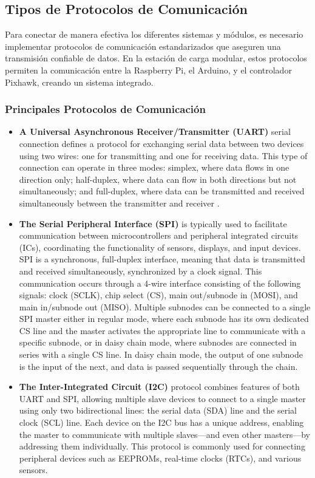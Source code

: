 \documentclass{article}
\begin{document}
\subsection{Tipos de Protocolos de Comunicación}

Para conectar de manera efectiva los diferentes sistemas y módulos, es necesario implementar protocolos de comunicación estandarizados que aseguren una transmisión confiable de datos. En la estación de carga modular, estos protocolos permiten la comunicación entre la Raspberry Pi, el Arduino, y el controlador Pixhawk, creando un sistema integrado.

\subsubsection{Principales Protocolos de Comunicación}
\begin{itemize}
    \item \textbf{A Universal Asynchronous Receiver/Transmitter (UART)} serial connection defines a protocol for exchanging serial data between two devices using two wires: one for transmitting and one for receiving data. This type of connection can operate in three modes: simplex, where data flows in one direction only; half-duplex, where data can flow in both directions but not simultaneously; and full-duplex, where data can be transmitted and received simultaneously between the transmitter and receiver \cite{Gupta2019}.

    \item \textbf{The Serial Peripheral Interface (SPI)} is typically used to facilitate communication between microcontrollers and peripheral integrated circuits (ICs), coordinating the functionality of sensors, displays, and input devices. SPI is a synchronous, full-duplex interface, meaning that data is transmitted and received simultaneously, synchronized by a clock signal. This communication occurs through a 4-wire interface consisting of the following signals: clock (SCLK), chip select (CS), main out/subnode in (MOSI), and main in/subnode out (MISO). Multiple subnodes can be connected to a single SPI master either in regular mode, where each subnode has its own dedicated CS line and the master activates the appropriate line to communicate with a specific subnode, or in daisy chain mode, where subnodes are connected in series with a single CS line. In daisy chain mode, the output of one subnode is the input of the next, and data is passed sequentially through the chain. \cite{Wootton2016}
    
    \item  \textbf{The Inter-Integrated Circuit (I2C)} protocol combines features of both UART and SPI, allowing multiple slave devices to connect to a single master using only two bidirectional lines: the serial data (SDA) line and the serial clock (SCL) line. Each device on the I2C bus has a unique address, enabling the master to communicate with multiple slaves—and even other masters—by addressing them individually. This protocol is commonly used for connecting peripheral devices such as EEPROMs, real-time clocks (RTCs), and various sensors. \cite{Gazi2021}
\end{itemize}
\end{document}
